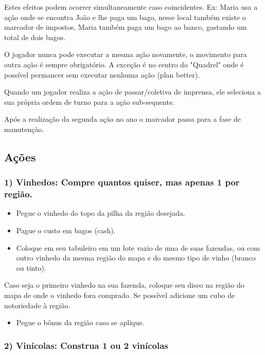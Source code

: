 \documentclass[11pt]{article}
\begin{document}
Estes efeitos podem ocorrer simultaneamente caso coincidentes.
Ex: Maria usa a ação onde se encontra João e lhe paga um bago, nesse local também existe o marcador de impostos, Maria também paga um bago ao banco, gastando um total de dois bagos.

O jogador nunca pode executar a mesma ação novamente, o movimento para outra ação é sempre obrigatório. A exceção é no centro do "Quadrel" onde é possível permancer sem executar nenhuma ação (plan better).

Quando um jogador realiza a ação de passar/coletiva de imprensa, ele seleciona a sua própria ordem de turno para a ação sub-sequente.

Após a realização da segunda ação no ano o marcador passa para a fase de manutenção.

\subsection{Ações}
\label{sec:org0a0bfe9}

\subsubsection{1) Vinhedos: Compre quantos quiser, mas apenas 1 por região.}
\label{sec:orgcd697e6}

\begin{itemize}
\item Pegue o vinhedo do topo da pilha da região desejada.
\item Pague o custo em bagos (cash).
\item Coloque em seu tabuleiro em um lote vazio de uma de suas fazendas, ou com outro vinhedo da mesma região do mapa e do mesmo tipo de vinho (branco ou tinto).
\end{itemize}

Caso seja o primeiro vinhedo na sua fazenda, coloque seu disco na região do mapa de onde o vinhedo fora comprado. Se possível adicione um cubo de notoriedade à região.

\begin{itemize}
\item Pegue o bônus da região caso se aplique.
\end{itemize}

\subsubsection{2) Vinícolas: Construa 1 ou 2 vinícolas}
\label{sec:orgd84a30c}
\end{document}
